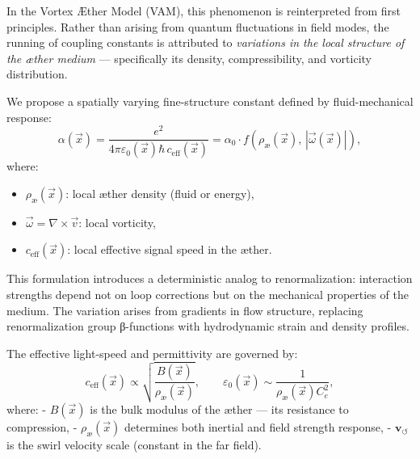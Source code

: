 \vspace{0.5em}

In the Vortex Æther Model (VAM), this phenomenon is reinterpreted from first principles. Rather than arising from quantum fluctuations in field modes, the running of coupling constants is attributed to \emph{variations in the local structure of the æther medium} — specifically its density, compressibility, and vorticity distribution.

We propose a spatially varying fine-structure constant defined by fluid-mechanical response:
\begin{equation}
\alpha(\vec{x}) = \frac{e^2}{4\pi \varepsilon_0(\vec{x}) \hbar \, c_{\text{eff}}(\vec{x})} = \alpha_0 \cdot f\left( \rho_\text{\ae}(\vec{x}), \, |\vec{\omega}(\vec{x})| \right),
\end{equation}
where:
\begin{itemize}
    \item \( \rho_\text{\ae}(\vec{x}) \): local æther density (fluid or energy),
    \item \( \vec{\omega} = \nabla \times \vec{v} \): local vorticity,
    \item \( c_{\text{eff}}(\vec{x}) \): local effective signal speed in the æther.
\end{itemize}

This formulation introduces a deterministic analog to renormalization: interaction strengths depend not on loop corrections but on the mechanical properties of the medium. The variation arises from gradients in flow structure, replacing renormalization group β-functions with hydrodynamic strain and density profiles.

\vspace{0.5em}

The effective light-speed and permittivity are governed by:
\begin{equation}
    c_{\text{eff}}(\vec{x}) \propto \sqrt{ \frac{B(\vec{x})}{\rho_\text{\ae}(\vec{x})} }, \qquad
    \varepsilon_0(\vec{x}) \sim \frac{1}{\rho_\text{\ae}(\vec{x}) C_e^2},
\end{equation}
where:
- \( B(\vec{x}) \) is the bulk modulus of the æther — its resistance to compression,
- \( \rho_\text{\ae}(\vec{x}) \) determines both inertial and field strength response,
- \( \mathbf{v}_{\scriptscriptstyle\boldsymbol{\circlearrowleft}} \) is the swirl velocity scale (constant in the far field).

\vspace{0.5em}

